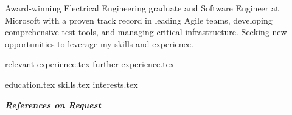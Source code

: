 \documentclass[letterpaper,11pt]{article}
\begin{document}
\thispagestyle{empty}

\vspace{0.8cm} 

Award-winning Electrical Engineering graduate and Software Engineer at Microsoft with a proven track record in leading Agile teams, developing comprehensive test tools, and managing critical infrastructure. Seeking new opportunities to leverage my skills and experience.


{relevant experience.tex}
{further experience.tex}


\newpage
{education.tex}
{skills.tex}
{interests.tex}
\thispagestyle{empty}

\centering
\textit{\textbf{References on Request}}
\end{document}
